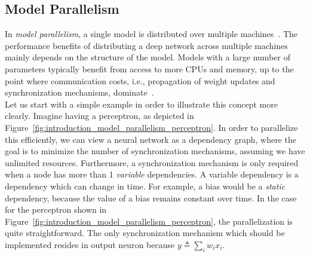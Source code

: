 \subsection{Model Parallelism}
\label{sec:intro_model_parallelism}

In \emph{model parallelism}, a single model is distributed over multiple machines~\cite{dean2012large}. The performance benefits of distributing a deep network across multiple machines mainly depends on the structure of the model. Models with a large number of parameters typically benefit from access to more CPUs and memory, up to the point where communication costs, i.e., propagation of weight updates and synchronization mechanisms, dominate~\cite{dean2012large}.\\

Let us start with a simple example in order to illustrate this concept more clearly. Imagine having a perceptron, as depicted in Figure~\ref{fig:introduction_model_parallelism_perceptron}. In order to parallelize this efficiently, we can view a neural network as a dependency graph, where the goal is to minimize the number of synchronization mechanisms, assuming we have unlimited resources. Furthermore, a synchronization mechanism is only required when a node has more than 1 \emph{variable} dependencies. A variable dependency is a dependency which can change in time. For example, a bias would be a \emph{static} dependency, because the value of a bias remains constant over time. In the case for the perceptron shown in Figure~\ref{fig:introduction_model_parallelism_perceptron}, the parallelization is quite straightforward. The only synchronization mechanism which should be implemented resides in output neuron because $y \triangleq \sum_i w_ix_i$.

